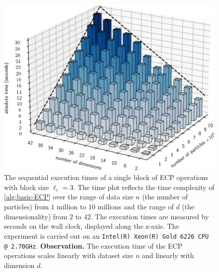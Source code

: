 \documentclass[final]{juliacon}
\begin{document}
\begin{figure}
  \centering
  \includegraphics[width=.9\linewidth]
  {images/ahrb-performance-ecp-single-block.pdf}
  \vspace*{0.5em}
  \caption{ %
    The sequential execution times of a single block of ECP operations
    with block size $\ell_{c}=3$. The time plot reflects the time
    complexity of \cref{alg:basic-ECP} over the range of data size $n$
    (the number of particles) from $1$ million to $10$ millions and
    the range of $d$ (the dimensionality) from $2$ to $42$. The
    execution times are measured by seconds on the wall clock,
    displayed along the z-axis.  %
    The experiment is carried out on an \texttt{Intel(R) Xeon(R) Gold 6226 CPU @ 2.70GHz}. %
    \textbf{Observation.} The execution time of the ECP operations
    scales linearly with dataset size $n$ and linearly with dimension
    $d$.  }
  \label{fig:ecp-single-block-performance}
\end{figure} %


%
%
%
%
\end{document}
